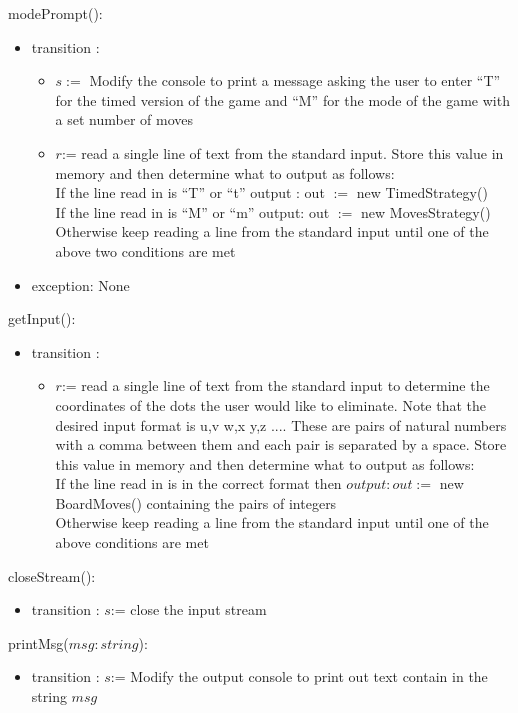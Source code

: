 \documentclass[12pt]{article}
\begin{document}
\noindent modePrompt(): 
\begin{itemize}
\item transition :
\begin{itemize}
\item $s:=$ Modify the console to print a message asking the user to enter ``T'' for the timed version of the game and ``M'' for the mode of the game with a set number of moves
\item $r$:= read a single line of text from the standard input. Store this value in memory and then determine what to output as follows:\\
If the line read in is ``T'' or ``t'' output : out $ := $ new TimedStrategy()\\
If the line read in is ``M'' or ``m'' output: out $ := $ new MovesStrategy()\\
Otherwise keep reading a line from the standard input until one of the above two conditions are met
\end{itemize}
\item exception: None
\end{itemize}

\noindent getInput(): 
\begin{itemize}
\item transition :
\begin{itemize}
\item $r$:= read a single line of text from the standard input to determine the coordinates of the dots the user would like to eliminate.
Note that the desired input format is u,v w,x y,z .... These are pairs of natural numbers with a comma between them and each pair is separated by a space. Store this value in memory and then determine what to output as follows:\\
If the line read in is in the correct format then $output: out :=$ new BoardMoves() containing the pairs of integers\\
Otherwise keep reading a line from the standard input until one of the above conditions are met
\end{itemize}
\end{itemize}

\noindent closeStream(): 
\begin{itemize}
\item transition : $s$:= close the input stream
\end{itemize}

\noindent printMsg($msg : string$): 
\begin{itemize}
\item transition : $s$:= Modify the output console to print out text contain in the string $msg$
\end{itemize}
\end{document}

